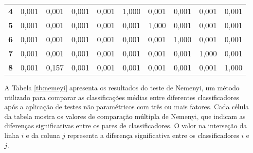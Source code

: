 \begin{table}[!htb]
\begin{tabular}{@{}clllllllll@{}}
		\textbf{4}                           & 0,001                          & 0,001                          & 0,001                          & 0,001                          & 1,000                          & 0,001                          & 0,001                          & 0,001                          & 0,001                          \\
		\textbf{5}                           & 0,001                          & 0,001                          & 0,001                          & 0,001                          & 0,001                          & 1,000                          & 0,001                          & 0,001                          & 0,001                          \\
		\textbf{6}                           & 0,001                          & 0,001                          & 0,001                          & 0,001                          & 0,001                          & 0,001                          & 1,000                          & 0,001                          & 0,001                          \\
		\textbf{7}                           & 0,001                          & 0,001                          & 0,001                          & 0,001                          & 0,001                          & 0,001                          & 0,001                          & 1,000                          & 0,001                          \\
		\textbf{8}                           & 0,001                          & 0,157                          & 0,001                          & 0,001                          & 0,001                          & 0,001                          & 0,001                          & 0,001                          & 1,000                          \\ \bottomrule
	\end{tabular}
	
\end{table}

A Tabela \ref{tb:nemeyi} apresenta os resultados do teste de Nemenyi, um método utilizado para comparar as classificações médias entre diferentes classificadores após a aplicação de testes não paramétricos com três ou mais fatores. Cada célula da tabela mostra os valores de comparação múltipla de Nemenyi, que indicam as diferenças significativas entre os pares de classificadores. O valor na interseção da linha $i$ e da coluna $j$ representa a diferença significativa entre os classificadores $i$ e $j$.

